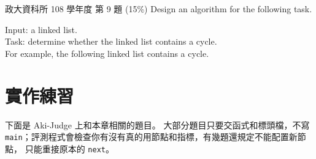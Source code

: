 \begin{pastexam}[label={px:ll-5}]{政大資科所 108 學年度 第 9 題}
(15\%) Design an algorithm for the following task.

\quad Input: a linked list.\\
\quad Task: determine whether the linked list contains a cycle.\\
\quad For example, the following linked list contains a cycle.
\begin{center}
\end{center}
\end{pastexam}

\section{實作練習}
\label{sec:ll-practice}

下面是 Aki-Judge 上和本章相關的題目。 大部分題目只要交函式和標頭檔，不寫
\texttt{main}；評測程式會檢查你有沒有真的用節點和指標，有幾題還規定不能配置新節點，
只能重接原本的 \texttt{next}。

